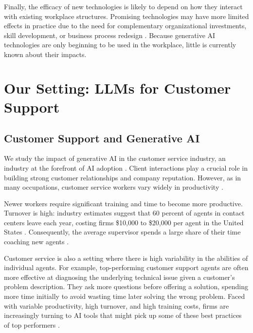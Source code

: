\documentclass[11pt]{article}
\begin{document}
Finally, the efficacy of new technologies is likely to depend on how they interact with existing workplace structures.  Promising technologies may have more limited effects in practice due to the need for complementary organizational investments, skill development, or business process redesign \cite{brynjolfsson2021productivity}. Because generative AI technologies are only beginning to be used in the workplace, little is currently known about their impacts.  

\section{Our Setting: LLMs for Customer Support}

\subsection{Customer Support and Generative AI}

We study the impact of generative AI in the customer service industry, an industry at the forefront of AI adoption \citep{chui_global_2021}.  Client interactions play a crucial role in building strong customer relationships and company reputation. However, as in many occupations, customer service workers vary widely in productivity \citep{berg2018, syverson2011}.

Newer workers require significant training and time to become more productive.  Turnover is high: industry estimates suggest that 60 percent of agents in contact centers leave each year, costing firms \$10,000 to \$20,000 per agent in the United States \citep{gretzBoostingContactcenterPerformance2018, buesing_customer_2020}. Consequently, the average supervisor spends a large share of their time coaching new agents \citep{berg2018}.  

Customer service is also a setting where there is high variability in the abilities of individual agents. For example, top-performing customer support agents are often more effective at diagnosing the underlying technical issue given a customer's problem description.  They ask more questions before offering a solution, spending more time initially to avoid wasting time later solving the wrong problem. Faced with variable productivity, high turnover, and high training costs, firms are increasingly turning to AI tools that might pick up some of these best practices of top performers \citep{chui_global_2021}.

\end{document}
